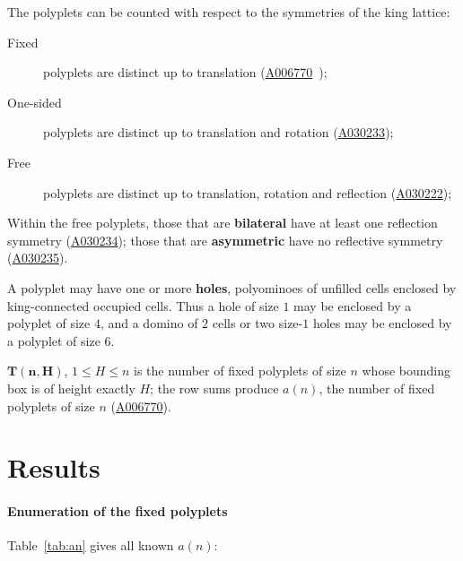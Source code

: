 \documentclass[11pt]{article}
\begin{document}
The polyplets can be counted with respect to the symmetries of the king lattice:
\begin{description}
\item[Fixed] polyplets are distinct up to translation (\href{https://oeis.org/A006770}{A006770}~\cite{oeis});
\item[One-sided] polyplets are distinct up to translation and rotation
	(\href{https://oeis.org/A030233}{A030233});
\item[Free] polyplets are distinct up to translation, rotation and reflection
	(\href{https://oeis.org/A030222}{A030222});
\end{description}

Within the free polyplets, those that are \textbf{bilateral} have at least one reflection symmetry
(\href{https://oeis.org/A030234}{A030234}); those that are \textbf{asymmetric} have no reflective
symmetry (\href{https://oeis.org/A030235}{A030235}).

A polyplet may have one or more \textbf{holes}, polyominoes of unfilled cells enclosed by
king-connected occupied cells.  Thus a hole of size $1$ may be enclosed by a polyplet of size $4$,
and a domino of $2$ cells or two size-$1$ holes may be enclosed by a polyplet of size $6$.

$\mathbf{T(n,H)}$, $1\le{H}\le{n}$ is the number of fixed polyplets of size $n$ whose bounding box
is of height exactly $H$; the row sums produce $a(n)$, the number of fixed polyplets of size $n$
(\href{https://oeis.org/A006770}{A006770}).

\section{Results}
\label{sec:results}


\paragraph{Enumeration of the fixed polyplets} Table~\ref{tab:an} gives all known $a(n)$:
\end{document}
